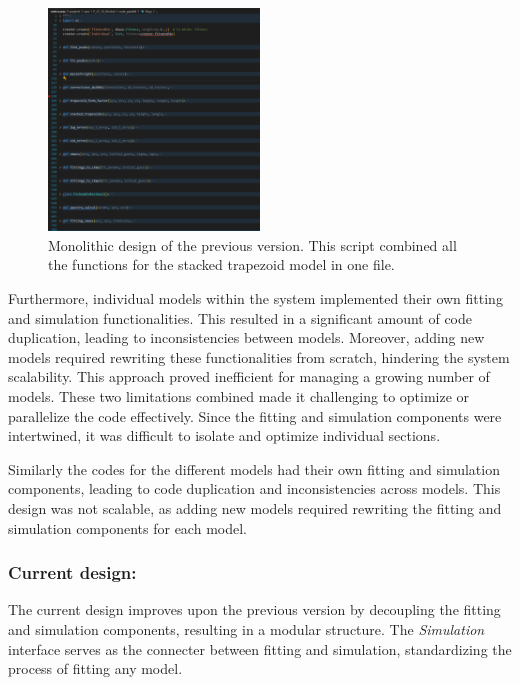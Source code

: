 \medskip

\begin{figure}[h]
    \centering
    \includegraphics[width=0.5\textwidth]{images/monolithic.png}
    \caption{Monolithic design of the previous version. This script combined all the functions for the stacked trapezoid model
    in one file.}
    \label{fig:monolithic_design}
\end{figure}

Furthermore, individual models within the system implemented their own fitting and simulation functionalities. This resulted in a 
significant amount of code duplication, leading to inconsistencies between models. Moreover, adding new models required rewriting 
these functionalities from scratch, hindering the system scalability. This approach proved inefficient for managing a growing number 
of models. These two limitations combined made it challenging to optimize or parallelize the code effectively. Since the fitting and 
simulation components were intertwined, it was difficult to isolate and optimize individual sections.

\medskip

Similarly the codes for the different models had their own fitting and simulation
components, leading to code duplication and inconsistencies across models. This design was not
scalable, as adding new models required rewriting the fitting and simulation components for each
model.

\subsubsection*{Current design:}

The current design improves upon the previous version by decoupling the fitting and 
simulation components, resulting in a modular structure. The \textit{Simulation} interface serves
 as the connecter between fitting and simulation, standardizing the process of fitting 
 any model.

